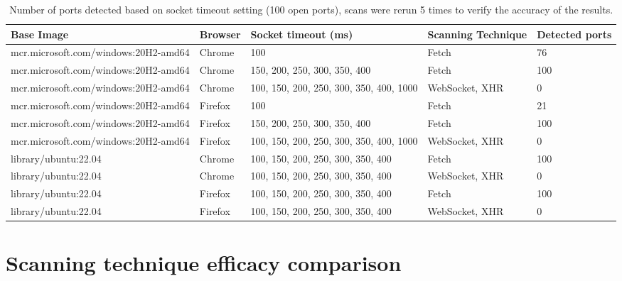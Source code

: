 \begin{table}[htbp]
\footnotesize
\centering
\begin{adjustwidth}{-1.0cm}{}
\begin{tabular}{p{6.3cm}p{1.5cm}p{3cm}p{2cm}p{2cm}}
    \toprule
    Base Image & Browser & Socket timeout (ms) & Scanning Technique & Detected ports \\
     \midrule
    mcr.microsoft.com/windows:20H2-amd64 & Chrome & 100 & Fetch & 76 \\
    mcr.microsoft.com/windows:20H2-amd64 & Chrome & 150, 200, 250, 300, 350, 400 & Fetch & 100 \\
    mcr.microsoft.com/windows:20H2-amd64 & Chrome & 100, 150, 200, 250, 300, 350, 400, 1000 & WebSocket, XHR & 0 \\
    \midrule
    mcr.microsoft.com/windows:20H2-amd64 & Firefox & 100 & Fetch & 21 \\
    mcr.microsoft.com/windows:20H2-amd64 & Firefox & 150, 200, 250, 300, 350, 400 & Fetch & 100 \\
    mcr.microsoft.com/windows:20H2-amd64 & Firefox & 100, 150, 200, 250, 300, 350, 400, 1000 & WebSocket, XHR & 0 \\
    \midrule
    library/ubuntu:22.04 & Chrome & 100, 150, 200, 250, 300, 350, 400 & Fetch & 100 \\
    library/ubuntu:22.04 & Chrome & 100, 150, 200, 250, 300, 350, 400 & WebSocket, XHR & 0 \\
    \midrule
    library/ubuntu:22.04 & Firefox & 100, 150, 200, 250, 300, 350, 400 & Fetch & 100 \\
    library/ubuntu:22.04 & Firefox & 100, 150, 200, 250, 300, 350, 400 & WebSocket, XHR & 0 \\
     \bottomrule
\end{tabular}
\end{adjustwidth}{}
\caption{Number of ports detected based on socket timeout setting (100 open ports), scans were rerun 5 times to verify the accuracy of the results.}
\label{tab:socket-timeout-comparison}
\end{table}

\clearpage

\section{Scanning technique efficacy comparison}

